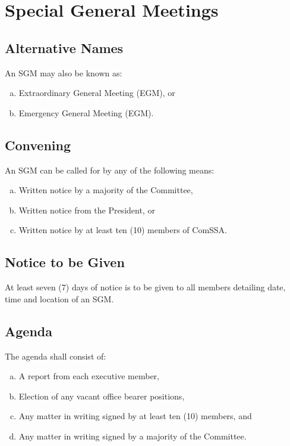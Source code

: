 \documentclass[a4paper,12pt]{article}
\begin{document}
\section{Special General Meetings}

\subsection{Alternative Names}

An SGM may also be known as:

\begin{enumerate}[a)]
	\item Extraordinary General Meeting (EGM), or
	\item Emergency General Meeting (EGM).
\end{enumerate}

\subsection{Convening}

An SGM can be called for by any of the following means:

\begin{enumerate}[a)]
	\item Written notice by a majority of the Committee,
	\item Written notice from the President, or
	\item Written notice by at least ten (10) members of ComSSA.
\end{enumerate}

\subsection{Notice to be Given}

At least seven (7) days of notice is to be given to all members detailing date, time and location of an SGM.

\subsection{Agenda}

The agenda shall consist of:

\begin{enumerate}[a)]
	\item A report from each executive member,
	\item Election of any vacant office bearer positions,
	\item Any matter in writing signed by at least ten (10) members, and
	\item Any matter in writing signed by a majority of the Committee.
\end{enumerate}
\end{document}
